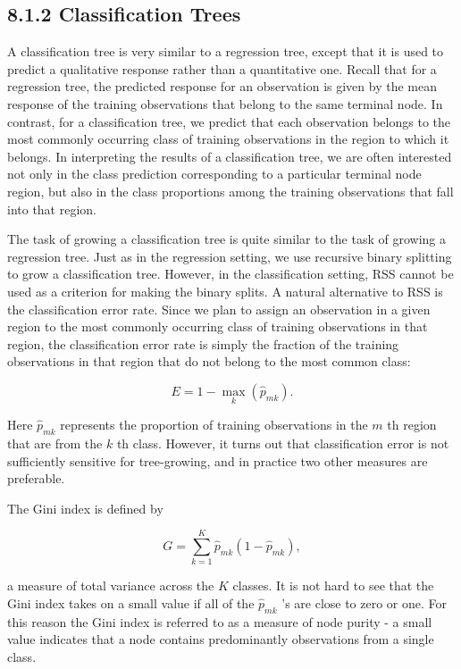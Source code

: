 \documentclass[10pt]{article}
\begin{document}
\subsection*{8.1.2 Classification Trees}
A classification tree is very similar to a regression tree, except that it is used to predict a qualitative response rather than a quantitative one. Recall that for a regression tree, the predicted response for an observation is given by the mean response of the training observations that belong to the same terminal node. In contrast, for a classification tree, we predict that each observation belongs to the most commonly occurring class of training observations in the region to which it belongs. In interpreting the results of a classification tree, we are often interested not only in the class prediction corresponding to a particular terminal node region, but also in the class proportions among the training observations that fall into that region.

The task of growing a classification tree is quite similar to the task of growing a regression tree. Just as in the regression setting, we use recursive binary splitting to grow a classification tree. However, in the classification setting, RSS cannot be used as a criterion for making the binary splits. A natural alternative to RSS is the classification error rate. Since we plan to assign an observation in a given region to the most commonly occurring class of training observations in that region, the classification error rate is simply the fraction of the training observations in that region that do not belong to the most common class:


\begin{equation*}
E=1-\max _{k}\left(\hat{p}_{m k}\right) . \tag{8.5}
\end{equation*}


Here $\hat{p}_{m k}$ represents the proportion of training observations in the $m$ th region that are from the $k$ th class. However, it turns out that classification error is not sufficiently sensitive for tree-growing, and in practice two other measures are preferable.

The Gini index is defined by


\begin{equation*}
G=\sum_{k=1}^{K} \hat{p}_{m k}\left(1-\hat{p}_{m k}\right), \tag{8.6}
\end{equation*}


a measure of total variance across the $K$ classes. It is not hard to see that the Gini index takes on a small value if all of the $\hat{p}_{m k}$ 's are close to zero or one. For this reason the Gini index is referred to as a measure of node purity - a small value indicates that a node contains predominantly observations from a single class.
\end{document}
